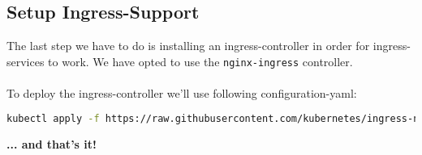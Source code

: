 \subsection{Setup Ingress-Support}
The last step we have to do is installing an ingress-controller in order for ingress-services to work. We have opted to use the \texttt{nginx-ingress} controller.\\\\To deploy the ingress-controller we'll use following configuration-yaml:
\begin{lstlisting}[language=bash,caption=Deploy nginx-ingress as ingress-controller] 
kubectl apply -f https://raw.githubusercontent.com/kubernetes/ingress-nginx/controller-v1.5.1/deploy/static/provider/cloud/deploy.yaml
\end{lstlisting}
\vspace{2cm}
\begin{center}
  \Large{\textbf{... and that's it!}}
\end{center}

